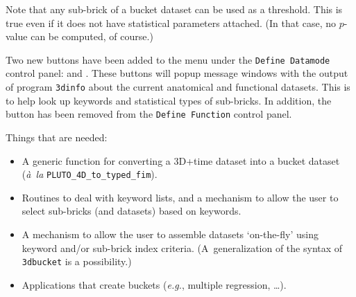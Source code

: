 \centerline{
            \blob\blob\blob
            }\vspace{1ex}

Note that any sub-brick of a bucket dataset can be used as a
threshold.  This is true even if it does not have statistical
parameters attached.  (In that case, no $p$-value can be
computed, of course.)

Two new buttons have been added to the  menu under the {\tt Define Datamode} control panel:
 and .
These buttons will popup message windows with the output of
program {\tt 3dinfo} about the current anatomical and functional datasets.
This is to help look up keywords and statistical types of sub-bricks.
In addition, the  button has been removed from the
{\tt Define Function} control panel.

Things that are needed:
\begin{itemize}
  \item A generic function for converting a 3D+time dataset into
        a bucket dataset ({\it \`a~la} {\tt PLUTO\_4D\_to\_typed\_fim}).
  \item Routines to deal with keyword lists, and a mechanism to
        allow the user to select sub-bricks (and datasets) based on keywords.
  \item A mechanism to allow the user to assemble datasets `on-the-fly'
        using keyword and/or sub-brick index criteria.  (A~generalization
        of the syntax of {\tt 3dbucket} is a possibility.)
  \item Applications that create buckets ({\it e.g.}, multiple regression, \ldots).
\end{itemize}


